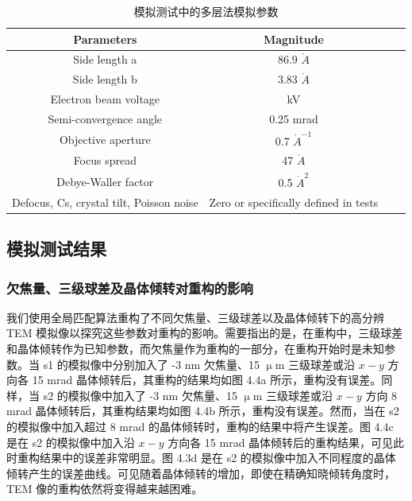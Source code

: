 \begin{table}[htbp]
	\caption{模拟测试中的多层法模拟参数}\label{tab:table1}
	\vspace{0.5em}\centering\wuhao
	\begin{tabular}{cccc}
		\toprule[1.5pt]
		Parameters & Magnitude\\
		\midrule[1pt]
		Side length a & 86.9 $\mathring{A}$ & \\
		Side length b & 3.83 $\mathring{A}$ \\
		\quad\quad\quad\quad\quad Electron beam voltage\qquad\quad\quad\quad\quad & \quad\quad\quad\quad\quad200 kV\qquad\quad\quad\quad\quad \\
		Semi-convergence angle & 0.25 mrad \\
		Objective aperture & 0.7 $\mathring{A}^{-1}$ \\
		Focus spread & 47 $\mathring{A}$ \\
		Debye-Waller factor & 0.5 $\mathring{A}^2$ \\
		Defocus, Cs, crystal tilt, Poisson noise & Zero or specifically defined in tests \\
		\bottomrule[1.5pt]
	\end{tabular}
	\vspace{\baselineskip}
\end{table}

\subsection{模拟测试结果}
\subsubsection{欠焦量、三级球差及晶体倾转对重构的影响}
我们使用全局匹配算法重构了不同欠焦量、三级球差以及晶体倾转下的高分辨 TEM 模拟像以探究这些参数对重构的影响。需要指出的是，在重构中，三级球差和晶体倾转作为已知参数，而欠焦量作为重构的一部分，在重构开始时是未知参数。当 s1 的模拟像中分别加入了 -3 nm 欠焦量、15 $\upmu$m 三级球差或沿 $x-y$ 方向各 15 mrad 晶体倾转后，其重构的结果均如图 4.4a 所示，重构没有误差。同样，当 s2 的模拟像中加入了 -3 nm 欠焦量、15 $\upmu$m 三级球差或沿 $x-y$ 方向 8 mrad 晶体倾转后，其重构结果均如图 4.4b 所示，重构没有误差。然而，当在 s2 的模拟像中加入超过 8 mrad 的晶体倾转时，重构的结果中将产生误差。图 4.4c 是在 s2 的模拟像中加入沿 $x-y$ 方向各 15 mrad 晶体倾转后的重构结果，可见此时重构结果中的误差非常明显。图 4.3d 是在 s2 的模拟像中加入不同程度的晶体倾转产生的误差曲线。可见随着晶体倾转的增加，即使在精确知晓倾转角度时，TEM 像的重构依然将变得越来越困难。

